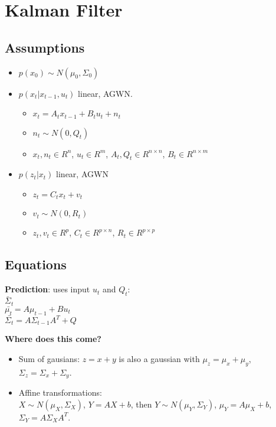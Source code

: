 \section{Kalman Filter}
\subsection*{Assumptions}
\begin{itemize}
  \item $p(x_0) \sim N(\mu_0, \Sigma_0)$
  \item $p(x_t|x_{t-1}, u_t)$ linear, AGWN.
    \begin{itemize}
      \item $x_t = A_t x_{t-1} + B_t u_t + n_t$
      \item $n_t \sim N(0, Q_t)$
      \item $x_t, n_t \in R^n$, $u_t \in R^m$, 
        $A_t, Q_t \in R^{n\times n}$, $B_t \in R^{n \times m}$
    \end{itemize}
  \item $p(z_t|x_t)$ linear, AGWN
    \begin{itemize}
      \item $z_t = C_t x_t + v_t$
      \item $v_t \sim N(0, R_t)$
      \item $z_t, v_t \in R^p$, $C_t \in R^{p \times n}$, $R_t \in R^{p
        \times p}$
    \end{itemize}
\end{itemize}

\subsection*{Equations}
\textbf{Prediction}: uses input $u_t$ and $Q_t$:\\
$\bar{\Sigma}_t$\\
$\bar{\mu_t} = A \mu_{t-1} + B u_t$ \\
$\bar{\Sigma_t} = A \Sigma_{t-1} A^T + Q$

\textbf{Where does this come?}
\begin{itemize}
  \item Sum of gausians: $z = x + y$ is also a gaussian with $\mu_z =
    \mu_x + \mu_y$, $\Sigma_z = \Sigma_x + \Sigma_y$.
  \item Affine transformations: \\$X \sim N(\mu_X, \Sigma_X)$, $Y= AX +
    b$, then $Y \sim N(\mu_Y, \Sigma_Y)$, $\mu_Y = A \mu_X + b$,\\
    $\Sigma_Y = A \Sigma_X A^T$.
\end{itemize}

